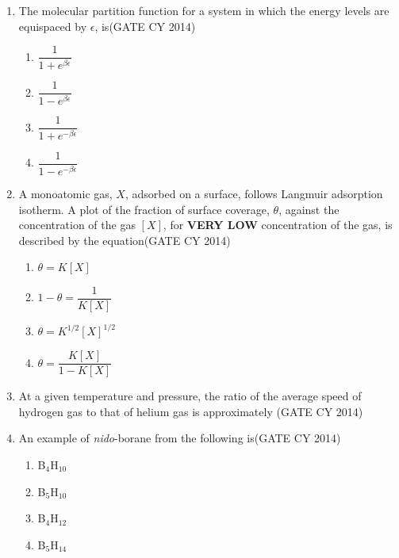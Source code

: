 \documentclass[a4paper,10pt]{exam}
\theoremstyle{remark}
\begin{document}
\begin{enumerate}
    \item The molecular partition function for a system in which the energy levels are equispaced by $\epsilon$, is\hfill{(GATE CY 2014)}
    \begin{multicols}{4}
    \begin{enumerate} 
        \item $\dfrac{1}{1 + e^{\beta\epsilon}}$
        \item $\dfrac{1}{1 - e^{\beta\epsilon}}$
        \item $\dfrac{1}{1 + e^{-\beta\epsilon}}$
        \item $\dfrac{1}{1 - e^{-\beta\epsilon}}$
    \end{enumerate}
    \end{multicols}

    \item A monoatomic gas, $X$, adsorbed on a surface, follows Langmuir adsorption isotherm. A plot of the fraction of surface coverage, $\theta$, against the concentration of the gas $[X]$,  for \textbf{VERY LOW} concentration of the gas, is described by the equation\hfill{(GATE CY 2014)}
    \begin{multicols}{2}
    \begin{enumerate} 
        \item $\theta = K [X]$
        \item $1 - \theta = \dfrac{1}{K [X]}$
        \item $\theta = K^{1/2} [X]^{1/2}$
        \item $\theta = \dfrac{K[X]}{1-K[X]}$
    \end{enumerate}
    \end{multicols}

    \item At a given temperature and pressure, the ratio of the average speed of hydrogen gas to that of helium gas is approximately \underline{\hspace{2cm}}\hfill{(GATE CY 2014)}

    \item An example of \textit{nido}-borane from the following is\hfill{(GATE CY 2014)}
    \begin{multicols}{4}
    \begin{enumerate} 
        \item B$_4$H$_{10}$
        \item B$_5$H$_{10}$
        \item B$_4$H$_{12}$
        \item B$_5$H$_{14}$
    \end{enumerate}
    \end{multicols}


\end{enumerate}
\end{document}
